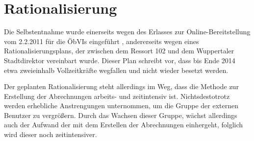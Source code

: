 
\section{Rationalisierung} \label{sec:rationalisierung}
Die Selbstentnahme wurde einerseits wegen des Erlasses zur Online-Bereitstellung vom 2.2.2011 für die \acp{ÖbVI} eingeführt \autocite[vgl.][]{wupp-wunda-oebvi}, andererseits wegen eines Rationalisierungsplans, der zwischen dem Ressort 102 und dem Wuppertaler Stadtdirektor vereinbart wurde.
Dieser Plan schreibt vor, dass bis Ende 2014 etwa zweieinhalb  Vollzeitkräfte wegfallen und nicht wieder besetzt werden.

Der geplanten Rationalisierung steht allerdings im Weg, dass die Methode zur Erstellung der Abrechnungen arbeits- und zeitintensiv ist.
Nichtsdestotrotz werden erhebliche Anstrengungen unternommen, um die Gruppe der externen Benutzer zu vergrößern.
Durch das Wachsen dieser Gruppe, wächst allerdings auch der Aufwand der mit dem Erstellen der Abrechnungen einhergeht, folglich wird dieser noch zeitintensiver.

